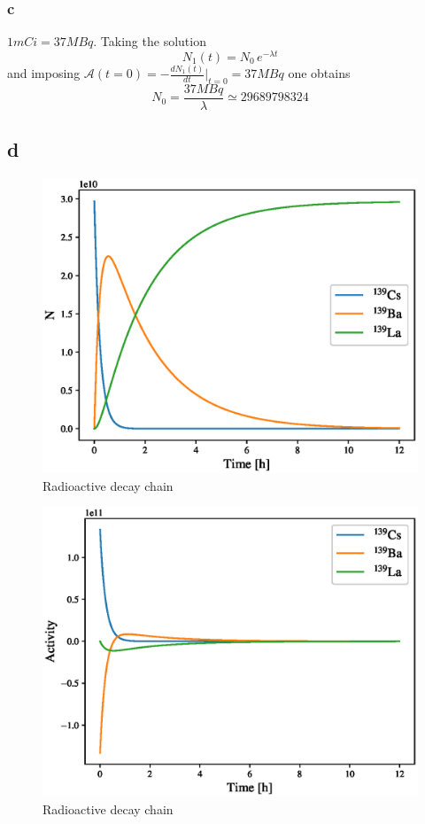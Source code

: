 \subsubsection*{c}
$1mCi = 37MBq$. Taking the solution
\begin{equation*}
    N_1(t) = N_0 \, e^{-\lambda t}
\end{equation*}
and imposing $\mathcal{A}(t=0) = -\frac{dN_1(t)}{dt}|_{t=0} = 37MBq$ one obtains
\begin{equation*}
    N_0 = \frac{37 MBq}{\lambda} \simeq 29689798324
\end{equation*}

\subsection*{d}
\begin{figure}[htbp]
    \centering
    \includegraphics[scale=0.8]{ex7/decay.eps}
    \caption{Radioactive decay chain}
    \label{fig:decay_chain}
\end{figure}

\begin{figure}[htbp]
    \centering
    \includegraphics[scale=0.8]{ex7/decay_activities.eps}
    \caption{Radioactive decay chain}
    \label{fig:decay_chain_activities}
\end{figure}


